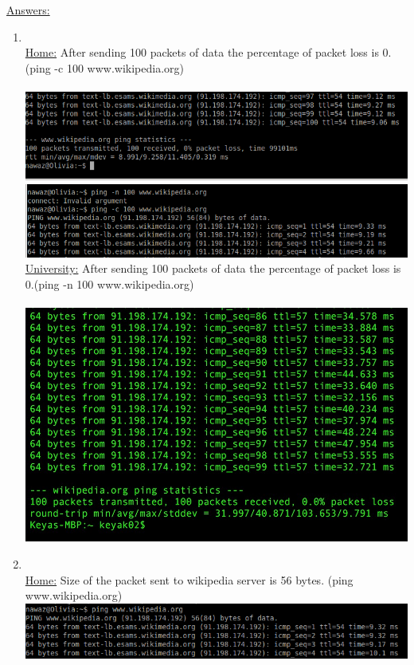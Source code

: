 \documentclass{WeSTassignment}
\begin{document}
\underline{Answers:}
\begin{enumerate}
\item \\
\underline{Home:} After sending 100 packets of data the percentage of packet loss is 0.(ping -c 100 www.wikipedia.org) \\
\\
\includegraphics[width=1\textwidth]{images/home-packet-loss(1-1).png}
\\
\includegraphics[width=1\textwidth]{images/home-packet-loss(1-2).png}
\\
\underline{University:} After sending 100 packets of data the percentage of packet loss is 0.(ping -n 100 www.wikipedia.org) \\
\\
\includegraphics[width=1\textwidth]{images/out-packet-loss(1-0).png}
\\
\item \\
\underline{Home:} Size of the packet sent to wikipedia server is 56 bytes. (ping www.wikipedia.org) \\
\includegraphics[width=1\textwidth]{images/home-packet-size(2-0).png}

\end{enumerate}
\end{document}
